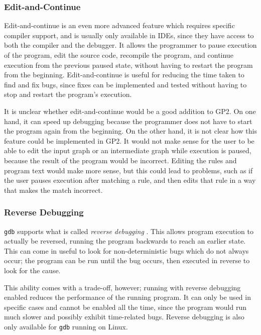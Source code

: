 \documentclass[authoryearcitations]{UoYCSproject}
\begin{document}

\subsubsection{Edit-and-Continue}
\label{sec:EditAndContinue}

Edit-and-continue is an even more advanced feature which requires specific
compiler support, and is usually only available in IDEs, since they have access
to both the compiler and the debugger. It allows the programmer to pause execution
of the program, edit the source code, recompile the program, and continue execution
from the previous paused state, without having to restart the program from the
beginning. Edit-and-continue is useful for reducing the time taken to find and
fix bugs, since fixes can be implemented and tested without having to stop and
restart the program's execution.

It is unclear whether edit-and-continue would be a good addition to GP2. On one
hand, it can speed up debugging because the programmer does not have to start the
program again from the beginning. On the other hand, it is not clear how this
feature could be implemented in GP2. It would not make sense for the user to be
able to edit the input graph or an intermediate graph while execution is paused,
because the result of the program would be incorrect. Editing the rules and
program text would make more sense, but this could lead to problems, such as if
the user pauses execution after matching a rule, and then edits that rule in
a way that makes the match incorrect.


\subsubsection{Reverse Debugging}
\label{sec:ReverseDebugging}

\texttt{gdb} supports what is called \emph{reverse debugging} \citep{gdbreversesite}.
This allows program execution to actually be reversed, running the program
backwards to reach an earlier state. This can come in useful to look for
non-deterministic bugs which do not always occur; the program can be run until
the bug occurs, then executed in reverse to look for the cause.

This ability comes with a trade-off, however; running with reverse debugging
enabled reduces the performance of the running program. It can only be used in
specific cases and cannot be enabled all the time, since the program would run
much slower and possibly exhibit time-related bugs. Reverse debugging is also
only available for \texttt{gdb} running on Linux.
\end{document}
